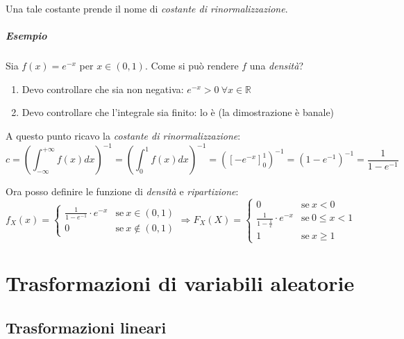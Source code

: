 \documentclass[12pt, a4paper]{report}
\theoremstyle{definition}
\DeclareRobustCommand{\R}{\mathbb{R}}%
\begin{document}
\noindent
Una tale costante prende il nome di \emph{costante di rinormalizzazione}.

\paragraph*{Esempio}
Sia \(f(x)=e^{-x}\) per \(x\in(0,1)\). Come si può rendere $f$ una \emph{densità}?
\begin{enumerate}[label=(\roman*)]
	\item Devo controllare che sia non negativa: \(e^{-x} > 0\ \forall x\in\R\)
	\item Devo controllare che l'integrale sia finito: lo è (la dimostrazione
	è banale)
\end{enumerate}

A questo punto ricavo la \emph{costante di rinormalizzazione}:
\[c=\left(\int_{-\infty}^{+\infty}f(x)dx\right)^{-1}=\left(\int_{0}^{1}f(x)dx
\right)^{-1}=([-e^{-x}]_{0}^{1})^{-1}=(1-e^{-1})^{-1}=\frac{1}{1-e^{-1}}\]

Ora posso definire le funzione di \emph{densità} e \emph{ripartizione}:
\[f_X(x)=\begin{cases}
	{\frac{1}{1-e^{-1}}\cdot e^{-x}} & \text{se}\ {x\in(0,1)}\\
	{0} & \text{se}\ {x\notin(0,1)}
\end{cases}\Rightarrow F_X(X)=\begin{cases}
	{0} & \text{se}\ {x<0}\\
	{\frac{1}{1 - \frac{1}{e}}\cdot e^{-x}} & \text{se}\ {0\leq x<1}\\
	{1} & \text{se}\ {x\geq 1}
\end{cases}\]

\chapter{Trasformazioni di variabili aleatorie}

\section{Trasformazioni lineari}
\end{document}
